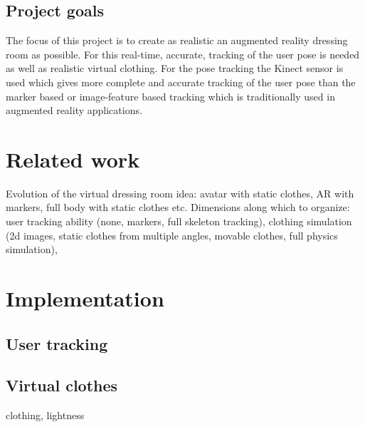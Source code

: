 \documentclass[a4paper]{article}
\begin{document}
\subsection{Project goals}

The focus of this project is to create as realistic an augmented reality dressing room as possible. For this real-time, accurate, tracking of the user pose is needed as well as realistic virtual clothing. For the pose tracking the Kinect sensor is used which gives more complete and accurate tracking of the user pose than the marker based or image-feature based tracking which is traditionally used in augmented reality applications.

\section{Related work}

Evolution of the virtual dressing room idea: avatar with static clothes, AR with markers, full body with static clothes etc. Dimensions along which to organize: user tracking ability (none, markers, full skeleton tracking), clothing simulation (2d images, static clothes from multiple angles, movable clothes, full physics simulation),

\section{Implementation}

\subsection{User tracking}

\subsection{Virtual clothes}

clothing, lightness
\end{document}

